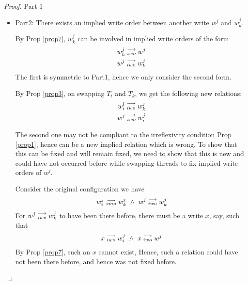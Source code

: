 \begin{proof}{Part 1}
\begin{itemize}
                        By Prop \ref{prop3}, swapping $T_i$ and $T_k$ to fix $\reln{w_k^l}{iwo}{w_i^j}$, gives us the following new relations.
                        \begin{align*}
                            \reln{w_i^l}{iwo}{w_k^j} \\
                            \reln{w^j}{iwo}{w_k^j}
                        \end{align*}
                        Both these relations repsect our irreflexivity constraint Prop \ref{prop1}. Thus, concluding this part. 

                    \item Part2: There exists an implied write order between another write $w^j$ and $w_k^j$. 

                        By Prop \ref{prop7}, $w_k^j$ can be involved in implied write orders of the form
                        \begin{align*}
                            w_k^j\stackrel{\longrightarrow}{_{iwo}}w^j \\
                            w^j\stackrel{\longrightarrow}{_{iwo}}w_k^j 
                        \end{align*}
                        The first is symmetric to Part1, hence we only consider the second form. 

                        By Prop \ref{prop3}, on swapping $T_i$ and $T_k$, we get the following new relations:
                        \begin{align*}
                            w_i^l\stackrel{\longrightarrow}{_{iwo}}w_k^j \\
                            w^j\stackrel{\longrightarrow}{_{iwo}}w_i^j
                        \end{align*}

                        The second one may not be compliant to the irreflexivity condition Prop \ref{prop1}, hence can be a new implied    relation which is wrong. To show that this can be fixed and will remain fixed, we need to show that this is new and could have not occurred before while swapping threads to fix implied write orders of $w^j$. 

                        Consider the original configuration we have 
                        \begin{align*}
                            \reln{w_i^j}{smo}{w_k^j} \ \wedge \ \reln{w^j}{iwo}{w_k^j}
                        \end{align*}
                        For $w^j\stackrel{\longrightarrow}{_{iwo}}w_k^j$ to have been there before, there must be a write $x$, say, such that 
                        \begin{align*}
                            \reln{x}{iwo}{w_i^j} \ \wedge \ \reln{x}{iwo}{w^j}
                        \end{align*}
                        By Prop \ref{prop7}, such an $x$ cannot exist, Hence, such a relation could have not been there before, and hence was   not fixed before.


\end{itemize}
\end{proof}
